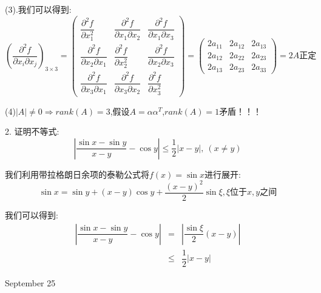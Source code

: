 \begin{solution}
(3).我们可以得到:  
$$\left( \dfrac{\partial^2 f}{\partial x_{i}\partial x_{j}}\right)_{3\times 3}=\left( \begin{matrix}
	\dfrac{\partial^2 f}{\partial x_{1}^2}&\dfrac{\partial^2 f}{\partial x_{1}\partial x_{2}}&\dfrac{\partial^2 f}{\partial x_{1}\partial x_{3}}\\
	\dfrac{\partial^2 f}{\partial x_{2}\partial x_{1}}&\dfrac{\partial^2 f}{\partial x_{2}^2}&\dfrac{\partial^2 f}{\partial x_{2}\partial x_{3}}\\
	\dfrac{\partial^2 f}{\partial x_{3}\partial x_{1}}&\dfrac{\partial^2 f}{\partial x_{3}\partial x_{2}}&\dfrac{\partial^2 f}{\partial x_{3}^2}
\end{matrix}\right)=\left( \begin{matrix}
2a_{11}&2a_{12}&2a_{13}\\
2a_{12}&2a_{22}&2a_{23}\\
2a_{13}&2a_{23}&2a_{33}
\end{matrix}\right)=2A\text{正定}$$

(4)$|A|\neq 0\Rightarrow rank(A)=3$,假设$A=\alpha\alpha^{T}$,$rank(A)=1$矛盾！！！
\end{solution}


2. 证明不等式:  $$|\dfrac{\sin x-\sin y}{x-y}-\cos y|\leq \dfrac{1}{2}|x-y|,\ (x\neq y)$$
\begin{solution}

	我们利用带拉格朗日余项的泰勒公式将$f(x)=\sin x$进行展开:  
	$$\sin x=\sin y+(x-y)\cos y+\dfrac{(x-y)^2}{2}\sin\xi, \xi\text{位于}x,y\text{之间}$$
	
	我们可以得到:  
	\begin{eqnarray*}
		|\dfrac{\sin x-\sin y}{x-y}-\cos y|&=&|\dfrac{\sin\xi}{2}(x-y)|\\
		&\leq&\dfrac{1}{2}|x-y|
	\end{eqnarray*}
\end{solution}

\textcolor{purplea}{September 25}

